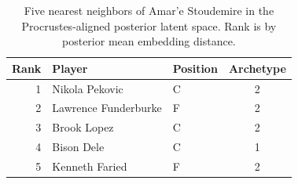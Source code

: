 \begin{table}[htbp]
  \centering\small
  \begin{tabular}{rllc}
    \toprule
    Rank & Player & Position & Archetype \\
    \midrule
    1 & Nikola Pekovic & C & 2 \\
    2 & Lawrence Funderburke & F & 2 \\
    3 & Brook Lopez & C & 2 \\
    4 & Bison Dele & C & 1 \\
    5 & Kenneth Faried & F & 2 \\
    \bottomrule
  \end{tabular}
  \caption{Five nearest neighbors of Amar'e Stoudemire in the Procrustes-aligned posterior latent space. Rank is by posterior mean embedding distance.}
  \label{tab:Amar_e_Stoudemire_neighbors}
\end{table}

